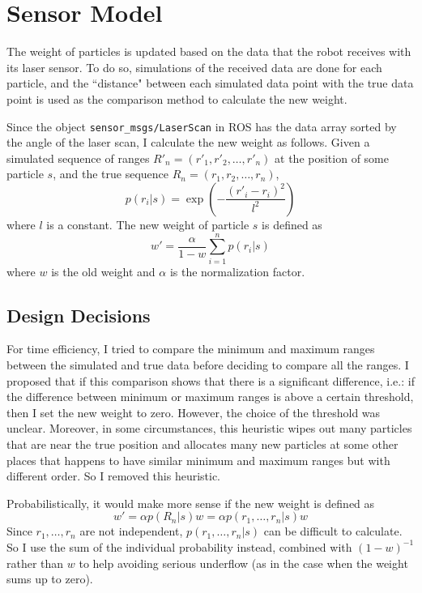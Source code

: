 \documentclass[10pt]{article}
\begin{document}
\section{Sensor Model}
The weight of particles is updated based on the data that the robot receives with its laser sensor. To do so, simulations of the received data are done for each particle, and the ``distance" between each simulated data point with the true data point is used as the comparison method to calculate the new weight. 

Since the object \texttt{sensor\_msgs/LaserScan} in ROS has the data array sorted by the angle of the laser scan, I calculate the new weight as follows. Given a simulated sequence of ranges $R'_n = (r'_1, r'_2, \dots, r'_n)$ at the position of some particle $s$, and the true sequence $R_n = (r_1, r_2, \dots, r_n)$,
\begin{displaymath}
	p(r_i|s) = \exp\left(-\frac{\left(r'_i - r_i\right)^2}{l^2}\right)
\end{displaymath}
where $l$ is a constant. The new weight of particle $s$ is defined as
\begin{displaymath}
	w' = \frac{\alpha}{1-w} \sum_{i=1}^n p(r_i|s)
\end{displaymath}
where $w$ is the old weight and $\alpha$ is the normalization factor.

\subsection{Design Decisions}
For time efficiency, I tried to compare the minimum and maximum ranges between the simulated and true data before deciding to compare all the ranges. I proposed that if this comparison shows that there is a significant difference, i.e.: if the difference between minimum or maximum ranges is above a certain threshold, then I set the new weight to zero. However, the choice of the threshold was unclear. Moreover, in some circumstances, this heuristic wipes out many particles that are near the true position and allocates many new particles at some other places that happens to have similar minimum and maximum ranges but with different order. So I removed this heuristic. 

Probabilistically, it would make more sense if the new weight is defined as
\begin{displaymath}
	w' = \alpha p(R_n|s)w = \alpha p(r_1, \dots, r_n|s)w
\end{displaymath} 
Since $r_1, \dots, r_n$ are not independent, $p(r_1, \dots, r_n|s)$ can be difficult to calculate. So I use the sum of the individual probability instead, combined with $(1-w)^{-1}$ rather than $w$ to help avoiding serious underflow (as in the case when the weight sums up to zero). 
\end{document}
